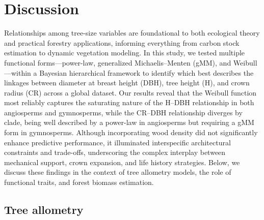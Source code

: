 \documentclass[
  12pt,
  letterpaper,
  DIV=11,
  numbers=noendperiod]{scrartcl}
\begin{document}
\hypertarget{discussion}{%
\section{Discussion}\label{discussion}}

Relationships among tree-size variables are foundational to both
ecological theory and practical forestry applications, informing
everything from carbon stock estimation to dynamic vegetation modeling.
In this study, we tested multiple functional forms---power-law,
generalized Michaelis--Menten (gMM), and Weibull---within a Bayesian
hierarchical framework to identify which best describes the linkages
between diameter at breast height (DBH), tree height (H), and crown
radius (CR) across a global dataset. Our results reveal that the Weibull
function most reliably captures the saturating nature of the H--DBH
relationship in both angiosperms and gymnosperms, while the CR--DBH
relationship diverges by clade, being well described by a power-law in
angiosperms but requiring a gMM form in gymnosperms. Although
incorporating wood density did not significantly enhance predictive
performance, it illuminated interspecific architectural constraints and
trade-offs, underscoring the complex interplay between mechanical
support, crown expansion, and life history strategies. Below, we discuss
these findings in the context of tree allometry models, the role of
functional traits, and forest biomass estimation.

\hypertarget{tree-allometry}{%
\subsection{Tree allometry}\label{tree-allometry}}
\end{document}
